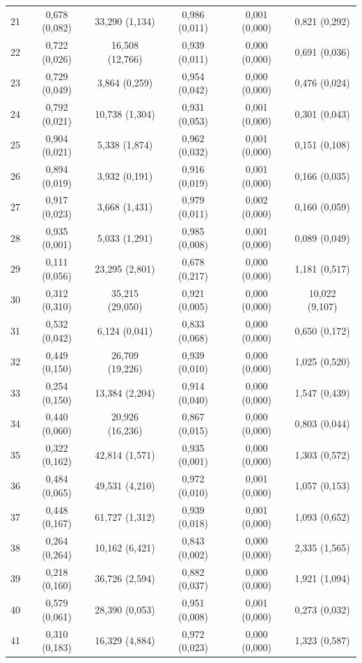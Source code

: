 \begin{tabular}{l c c c c c}
21 & 0,678 (0,082) & 33,290 (1,134) & 0,986 (0,011) & 0,001 (0,000) & 0,821 (0,292) \\
22 & 0,722 (0,026) & 16,508 (12,766) & 0,939 (0,011) & 0,000 (0,000) & 0,691 (0,036) \\
23 & 0,729 (0,049) & 3,864 (0,259) & 0,954 (0,042) & 0,000 (0,000) & 0,476 (0,024) \\
24 & 0,792 (0,021) & 10,738 (1,304) & 0,931 (0,053) & 0,001 (0,000) & 0,301 (0,043) \\
25 & 0,904 (0,021) & 5,338 (1,874) & 0,962 (0,032) & 0,001 (0,000) & 0,151 (0,108) \\
26 & 0,894 (0,019) & 3,932 (0,191) & 0,916 (0,019) & 0,001 (0,000) & 0,166 (0,035) \\
27 & 0,917 (0,023) & 3,668 (1,431) & 0,979 (0,011) & 0,002 (0,000) & 0,160 (0,059) \\
28 & 0,935 (0,001) & 5,033 (1,291) & 0,985 (0,008) & 0,001 (0,000) & 0,089 (0,049) \\
29 & 0,111 (0,056) & 23,295 (2,801) & 0,678 (0,217) & 0,000 (0,000) & 1,181 (0,517) \\
30 & 0,312 (0,310) & 35,215 (29,050) & 0,921 (0,005) & 0,000 (0,000) & 10,022 (9,107) \\
31 & 0,532 (0,042) & 6,124 (0,041) & 0,833 (0,068) & 0,000 (0,000) & 0,650 (0,172) \\
32 & 0,449 (0,150) & 26,709 (19,226) & 0,939 (0,010) & 0,000 (0,000) & 1,025 (0,520) \\
33 & 0,254 (0,150) & 13,384 (2,204) & 0,914 (0,040) & 0,000 (0,000) & 1,547 (0,439) \\
34 & 0,440 (0,060) & 20,926 (16,236) & 0,867 (0,015) & 0,000 (0,000) & 0,803 (0,044) \\
35 & 0,322 (0,162) & 42,814 (1,571) & 0,935 (0,001) & 0,000 (0,000) & 1,303 (0,572) \\
36 & 0,484 (0,065) & 49,531 (4,210) & 0,972 (0,010) & 0,001 (0,000) & 1,057 (0,153) \\
37 & 0,448 (0,167) & 61,727 (1,312) & 0,939 (0,018) & 0,001 (0,000) & 1,093 (0,652) \\
38 & 0,264 (0,264) & 10,162 (6,421) & 0,843 (0,002) & 0,000 (0,000) & 2,335 (1,565) \\
39 & 0,218 (0,160) & 36,726 (2,594) & 0,882 (0,037) & 0,000 (0,000) & 1,921 (1,094) \\
40 & 0,579 (0,061) & 28,390 (0,053) & 0,951 (0,008) & 0,001 (0,000) & 0,273 (0,032) \\
41 & 0,310 (0,183) & 16,329 (4,884) & 0,972 (0,023) & 0,000 (0,000) & 1,323 (0,587) \\

\end{tabular}
